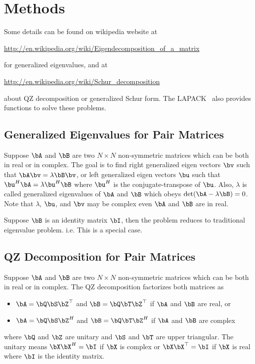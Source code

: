 
\section[Methods]{Methods}
\label{sec:methods}

Some details can be found on wikipedia website at
\begin{center}
\url{http://en.wikipedia.org/wiki/Eigendecomposition_of_a_matrix}
\end{center}
for generalized eigenvalues, and at
\begin{center}
\url{http://en.wikipedia.org/wiki/Schur_decomposition}
\end{center}
about QZ decomposition or generalized Schur form.
The LAPACK~\citep{laug} also provides functions to
solve these problems.


\subsection[Generalized Eigenvalues for Pair Matrices]{Generalized Eigenvalues for Pair Matrices}
\label{sec:generalized_eigenvalues_pair}

Suppose $\bA$ and $\bB$ are two $N\times N$ non-symmetric matrices
which can be both in real or in complex. The goal is to find right generalized
eigen vectors $\bv$ such that $\bA \bv = \lambda \bB \bv$, or left generalized
eigen vectors $\bu$ such
that $\bu^{H} \bA = \lambda \bu^{H} \bB$ where $\bu^{H}$ is the
conjugate-transpose of $\bu$.
Also, $\lambda$ is called generalized eigenvalues of $\bA$ and $\bB$
which obeys $\mbox{det}(\bA - \lambda\bB) = 0$.
Note that $\lambda$, $\bu$, and $\bv$ may be complex even $\bA$ and $\bB$
are in real.

Suppose $\bB$ is an identity matrix $\bI$, then the problem reduces to
traditional eigenvalue problem. i.e. This is a special case.


\subsection[QZ Decomposition for Pair Matrices]{QZ Decomposition for Pair Matrices}
\label{sec:qz_decomposition_pair}

Suppose $\bA$ and $\bB$ are two $N\times N$ non-symmetric matrices
which can be both in real or in complex.
The QZ decomposition factorizes both matrices as
\begin{itemize}
\item
$\bA = \bQ\bS\bZ^\top$ and $\bB = \bQ\bT\bZ^\top$
if $\bA$ and $\bB$ are real, or
\item
$\bA = \bQ\bS\bZ^{H}$ and $\bB = \bQ\bT\bZ^{H}$
if $\bA$ and $\bB$ are complex
\end{itemize}
where $\bQ$ and $\bZ$ are unitary and $\bS$ and $\bT$ are upper triangular.
The unitary means $\bX\bX^{H} = \bI$ if $\bX$ is complex or
$\bX\bX^\top = \bI$ if $\bX$ is real where $\bI$ is the identity matrix.

